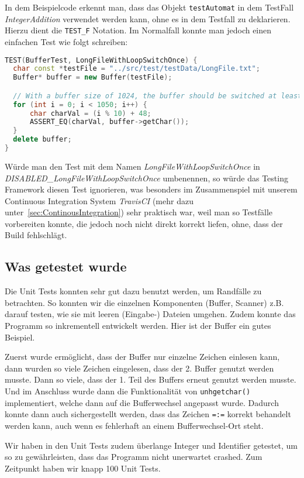 In dem Beispielcode erkennt man, dass das Objekt \texttt{testAutomat} in dem TestFall \emph{IntegerAddition} verwendet werden kann, ohne es in dem Testfall zu deklarieren. Hierzu dient die \texttt{TEST\_F} Notation. Im Normalfall konnte man jedoch einen einfachen Test wie folgt schreiben:

\begin{lstlisting}[language=C++, caption=Einfacher Unit Test]
TEST(BufferTest, LongFileWithLoopSwitchOnce) {
  char const *testFile = "../src/test/testData/LongFile.txt";
  Buffer* buffer = new Buffer(testFile);

  // With a buffer size of 1024, the buffer should be switched at least once
  for (int i = 0; i < 1050; i++) {
      char charVal = (i % 10) + 48;
      ASSERT_EQ(charVal, buffer->getChar());
  }
  delete buffer;
}
\end{lstlisting}

Würde man den Test mit dem Namen \emph{LongFileWithLoopSwitchOnce} in \emph{DISABLED\-\_LongFileWithLoopSwitchOnce} umbenennen, so würde das Testing Framework diesen Test ignorieren, was besonders im Zusammenspiel mit unserem Continuous Integration System \textit{TravisCI} (mehr dazu unter~\ref{sec:ContinousIntegration}) sehr praktisch war, weil man so Testfälle vorbereiten konnte, die jedoch noch nicht direkt korrekt liefen, ohne, dass der Build fehlschlägt.

\subsection{Was getestet wurde}
Die Unit Tests konnten sehr gut dazu benutzt werden, um Randfälle zu betrachten. So konnten wir die einzelnen Komponenten (Buffer, Scanner) z.B. darauf testen, wie sie mit leeren (Eingabe-) Dateien umgehen. Zudem konnte das Programm so inkrementell entwickelt werden. Hier ist der Buffer ein gutes Beispiel.

Zuerst wurde ermöglicht, dass der Buffer nur einzelne Zeichen einlesen kann, dann wurden so viele Zeichen eingelesen, dass der 2. Buffer genutzt werden musste. Dann so viele, dass der 1. Teil des Buffers erneut genutzt werden musste. Und im Anschluss wurde dann die Funktionalität von \texttt{unhgetchar()} implementiert, welche dann auf die Bufferwechsel angepasst wurde. Dadurch konnte dann auch sichergestellt werden, dass das Zeichen \texttt{=:=} korrekt behandelt werden kann, auch wenn es fehlerhaft an einem Bufferwechsel-Ort steht.

Wir haben in den Unit Tests zudem überlange Integer und Identifier getestet, um so zu gewährleisten, dass das Programm nicht unerwartet crashed. Zum Zeitpunkt haben wir knapp 100 Unit Tests.

